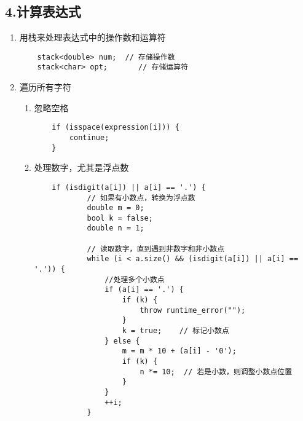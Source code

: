 \documentclass[a4paper]{article}
\begin{document}
\subsection*{4.计算表达式}
\begin{enumerate}
    \item 用栈来处理表达式中的操作数和运算符
    \begin{lstlisting}
    stack<double> num;  // 存储操作数
    stack<char> opt;       // 存储运算符
    \end{lstlisting}
    \item 遍历所有字符
    \begin{enumerate}
        \item 忽略空格
        \begin{lstlisting}
    if (isspace(expression[i])) {
        continue;
    }
        \end{lstlisting}
        \item 处理数字，尤其是浮点数
        \begin{lstlisting}
    if (isdigit(a[i]) || a[i] == '.') {
            // 如果有小数点，转换为浮点数
            double m = 0;
            bool k = false;
            double n = 1;

            // 读取数字，直到遇到非数字和非小数点
            while (i < a.size() && (isdigit(a[i]) || a[i] == '.')) {
                //处理多个小数点
                if (a[i] == '.') {
                    if (k) {
                        throw runtime_error("");
                    }
                    k = true;    // 标记小数点
                } else {
                    m = m * 10 + (a[i] - '0');
                    if (k) {
                        n *= 10;  // 若是小数，则调整小数点位置
                    }
                }
                ++i;
            }


\end{lstlisting}
\end{enumerate}
\end{enumerate}
\end{document}
